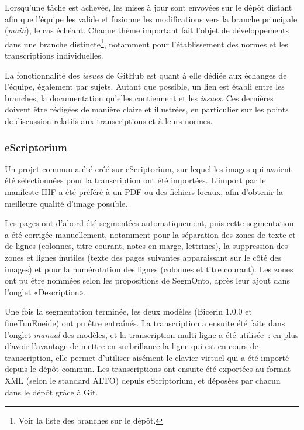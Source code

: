 \documentclass{article}
\begin{document}
	\vspace{3pt}
	
	Lorsqu'une tâche est achevée, les mises à jour sont envoyées sur le dépôt distant afin que l'équipe les valide et fusionne les modifications vers la branche principale (\textit{main}), le cas échéant. Chaque thème important fait l'objet de développements dans une branche distincte\footnote{Voir la liste des branches sur le dépôt.}, notamment pour l'établissement des normes et les transcriptions individuelles.
	\newline
	
	
	La fonctionnalité des \textit{issues} de GitHub est quant à elle dédiée aux échanges de l'équipe, également par sujets. Autant que possible, un lien est établi entre les branches, la documentation qu'elles contiennent et les \textit{issues}.
	Ces dernières doivent être rédigées de manière claire et illustrées, en particulier sur les points de discussion relatifs aux transcriptions et à leurs normes.
	
	\subsubsection{eScriptorium}
	
	Un projet commun a été créé sur eScriptorium, sur lequel les images qui avaient été sélectionnées pour la transcription ont été importées. L’import par le manifeste IIIF a été préféré à un PDF ou des fichiers locaux, afin d’obtenir la meilleure qualité d’image possible.
	
	Les pages ont d’abord été segmentées automatiquement, puis cette segmentation a été corrigée manuellement, notamment pour la séparation des zones de texte et de lignes (colonnes, titre courant, notes en marge, lettrines), la suppression des zones et lignes inutiles (texte des pages suivantes apparaissant sur le côté des images) et pour la numérotation des lignes (colonnes et titre courant). Les zones ont pu être nommées selon les propositions de SegmOnto, après leur ajout dans l’onglet «Description».
	
	Une fois la segmentation terminée, les deux modèles (Bicerin 1.0.0 et fineTunEneide) ont pu être entraînés. La transcription a ensuite été faite dans l’onglet \textit{manual} des modèles, et la transcription multi-ligne a été utilisée~: en plus d’avoir l’avantage de mettre en surbrillance la ligne qui est en cours de transcription, elle permet d’utiliser aisément le clavier virtuel qui a été importé depuis le dépôt commun. Les transcriptions ont ensuite été exportées au format XML (selon le standard ALTO) depuis eScriptorium, et déposées par chacun dans le dépôt grâce à Git.
	
\end{document}
